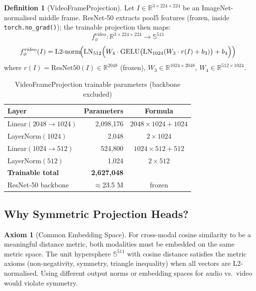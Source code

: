 \documentclass[12pt,a4paper]{article}
\theoremstyle{definition}
\newtheorem{definition}[theorem]{Definition}
\newtheorem{axiom}[theorem]{Axiom}
\theoremstyle{remark}
\begin{document}
\begin{definition}[VideoFrameProjection]
Let $I \in \mathbb{R}^{3 \times 224 \times 224}$ be an ImageNet-normalised
middle frame. ResNet-50 extracts pool5 features (frozen, inside
\texttt{torch.no\_grad()}); the trainable projection then maps:
\[
  f_\phi^{\text{video}} : \mathbb{R}^{3 \times 224 \times 224} \to \mathbb{S}^{511}
\]
\[
  f_\phi^{\text{video}}(I) = \text{L2-norm}\!\Bigl(\text{LN}_{512}\Bigl(
    W_4 \cdot \text{GELU}\bigl(\text{LN}_{1024}(W_3 \cdot r(I) + b_3)\bigr) + b_4
  \Bigr)\Bigr)
\]
where $r(I) = \text{ResNet50}(I) \in \mathbb{R}^{2048}$ (frozen),
$W_3 \in \mathbb{R}^{1024 \times 2048}$, $W_4 \in \mathbb{R}^{512 \times 1024}$.
\end{definition}

\begin{table}[H]
\centering
\caption{VideoFrameProjection trainable parameters (backbone excluded)}
\begin{tabular}{lrc}
\toprule
Layer & Parameters & Formula \\
\midrule
Linear$(2048 \to 1024)$ & 2,098,176 & $2048 \times 1024 + 1024$ \\
LayerNorm$(1024)$        & 2,048     & $2 \times 1024$ \\
Linear$(1024 \to 512)$  & 524,800   & $1024 \times 512 + 512$ \\
LayerNorm$(512)$         & 1,024     & $2 \times 512$ \\
\midrule
\textbf{Trainable total} & \textbf{2,627,048} & \\
ResNet-50 backbone       & $\approx$23.5 M & frozen \\
\bottomrule
\end{tabular}
\end{table}

\subsection{Why Symmetric Projection Heads?}

\begin{axiom}[Common Embedding Space]
For cross-modal cosine similarity to be a meaningful distance metric,
both modalities must be embedded on the same metric space. The unit
hypersphere $\mathbb{S}^{511}$ with cosine distance satisfies the
metric axioms (non-negativity, symmetry, triangle inequality) when
all vectors are L2-normalised. Using different output norms or
embedding spaces for audio vs.\ video would violate symmetry.
\end{axiom}
\end{document}
